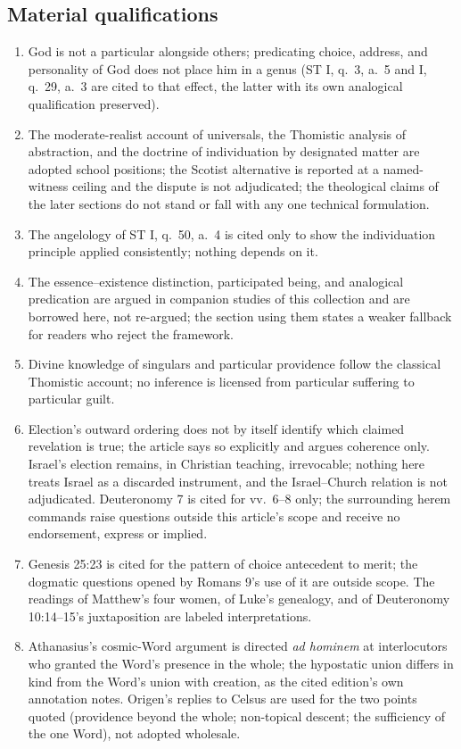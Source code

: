 \subsection{Material qualifications}

\begin{enumerate}
\item God is not a particular alongside others; predicating choice, address, and personality of God does not place him in a genus (ST I, q.~3, a.~5 and I, q.~29, a.~3 are cited to that effect, the latter with its own analogical qualification preserved).
\item The moderate-realist account of universals, the Thomistic analysis of abstraction, and the doctrine of individuation by designated matter are adopted school positions; the Scotist alternative is reported at a named-witness ceiling and the dispute is not adjudicated; the theological claims of the later sections do not stand or fall with any one technical formulation.
\item The angelology of ST I, q.~50, a.~4 is cited only to show the individuation principle applied consistently; nothing depends on it.
\item The essence--existence distinction, participated being, and analogical predication are argued in companion studies of this collection and are borrowed here, not re-argued; the section using them states a weaker fallback for readers who reject the framework.
\item Divine knowledge of singulars and particular providence follow the classical Thomistic account; no inference is licensed from particular suffering to particular guilt.
\item Election's outward ordering does not by itself identify which claimed revelation is true; the article says so explicitly and argues coherence only. Israel's election remains, in Christian teaching, irrevocable; nothing here treats Israel as a discarded instrument, and the Israel--Church relation is not adjudicated. Deuteronomy 7 is cited for vv.~6--8 only; the surrounding herem commands raise questions outside this article's scope and receive no endorsement, express or implied.
\item Genesis 25:23 is cited for the pattern of choice antecedent to merit; the dogmatic questions opened by Romans 9's use of it are outside scope. The readings of Matthew's four women, of Luke's genealogy, and of Deuteronomy 10:14--15's juxtaposition are labeled interpretations.
\item Athanasius's cosmic-Word argument is directed \emph{ad hominem} at interlocutors who granted the Word's presence in the whole; the hypostatic union differs in kind from the Word's union with creation, as the cited edition's own annotation notes. Origen's replies to Celsus are used for the two points quoted (providence beyond the whole; non-topical descent; the sufficiency of the one Word), not adopted wholesale.

\end{enumerate}
